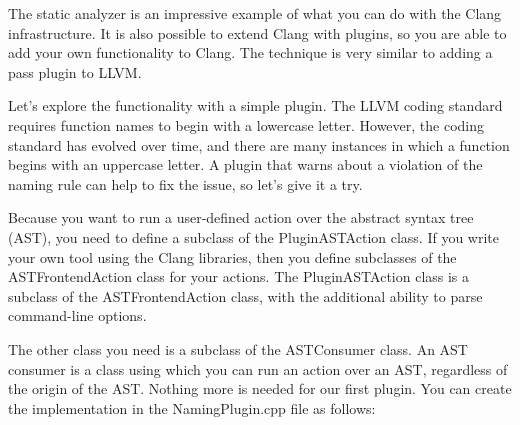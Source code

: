 The static analyzer is an impressive example of what you can do with the Clang infrastructure. It is also possible to extend Clang with plugins, so you are able to add your own functionality to Clang. The technique is very similar to adding a pass plugin to LLVM.\par

Let's explore the functionality with a simple plugin. The LLVM coding standard requires function names to begin with a lowercase letter. However, the coding standard has evolved over time, and there are many instances in which a function begins with an uppercase letter. A plugin that warns about a violation of the naming rule can help to fix the issue, so let's give it a try.\par

Because you want to run a user-defined action over the abstract syntax tree (AST), you need to define a subclass of the PluginASTAction class. If you write your own tool using the Clang libraries, then you define subclasses of the ASTFrontendAction class for your actions. The PluginASTAction class is a subclass of the ASTFrontendAction class, with the additional ability to parse command-line options.\par

The other class you need is a subclass of the ASTConsumer class. An AST consumer is a class using which you can run an action over an AST, regardless of the origin of the AST. Nothing more is needed for our first plugin. You can create the implementation in the NamingPlugin.cpp file as follows:\par

